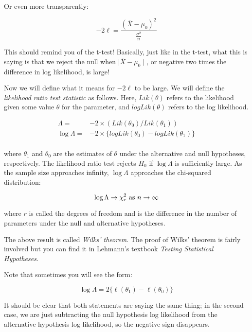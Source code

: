 \documentclass[12pt,]{krantz}
\begin{document}
Or even more transparently:

\begin{equation}
-2 \ell =    \frac{(\bar{X} - \mu_0)^2 }{\frac{\sigma^2}{n}}
\end{equation}

This should remind you of the t-test! Basically, just like in the t-test, what this is saying is that we reject the null when \(\mid \bar{X} - \mu_0\mid\), or negative two times the difference in log likelihood, is large!

Now we will define what it means for \(-2\ell\) to be large. We will define the \emph{likelihood ratio test statistic} as follows. Here, \(Lik(\theta)\) refers to the likelihood given some value \(\theta\) for the parameter, and
\(logLik(\theta)\) refers to the log likelihood.

\begin{equation}
\begin{split}
\Lambda =& -2\times (Lik(\theta_0)/Lik(\theta_1)) \\
\log \Lambda=& -2\times \{logLik(\theta_0)-logLik(\theta_1)\}\\
\end{split}
\end{equation}

where \(\theta_1\) and \(\theta_0\) are the estimates of \(\theta\) under the alternative and null hypotheses, respectively. The likelihood ratio test rejects \(H_0\) if \(\log \Lambda\) is sufficiently large. As the sample size approaches infinity, \(\log \Lambda\) approaches the chi-squared distribution:

\begin{equation}
\log \Lambda \rightarrow \chi_r^2  \hbox{ as }  n \rightarrow \infty
\end{equation}

where \(r\) is called the degrees of freedom and is the difference in the number of parameters under the null and alternative hypotheses.

The above result is called \emph{Wilks' theorem}. The proof of Wilks' theorem is fairly involved but you can find it in Lehmann's textbook \emph{Testing Statistical Hypotheses}.

Note that sometimes you will see the form:

\begin{equation}
 \log \Lambda = 2 \{\ell(\theta_1) - \ell(\theta_0)\}
\end{equation}

It should be clear that both statements are saying the same thing; in the second case, we are just subtracting the null hypothesis log likelihood from the alternative hypothesis log likelihood, so the negative sign disappears.
\end{document}
